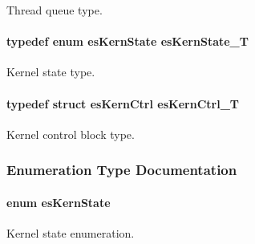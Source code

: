 Thread queue type. 

\hypertarget{group__kern__intf_gab5edef44fe53303f96dc5e9f567babaf}{
\paragraph[{es\-Kern\-State\-\_\-\-T}]{\setlength{\rightskip}{0pt plus 5cm}typedef enum {\bf es\-Kern\-State} {\bf es\-Kern\-State\-\_\-\-T}}}\label{group__kern__intf_gab5edef44fe53303f96dc5e9f567babaf}


Kernel state type. 

\hypertarget{group__kern__intf_gaae54a9918d92a2105b1d331b083d21b7}{
\paragraph[{es\-Kern\-Ctrl\-\_\-\-T}]{\setlength{\rightskip}{0pt plus 5cm}typedef struct {\bf es\-Kern\-Ctrl} {\bf es\-Kern\-Ctrl\-\_\-\-T}}}\label{group__kern__intf_gaae54a9918d92a2105b1d331b083d21b7}


Kernel control block type. 



\subsubsection{Enumeration Type Documentation}
\hypertarget{group__kern__intf_gac9be6bfeddbd6af148cdb3867fbc24af}{
\paragraph[{es\-Kern\-State}]{\setlength{\rightskip}{0pt plus 5cm}enum {\bf es\-Kern\-State}}}\label{group__kern__intf_gac9be6bfeddbd6af148cdb3867fbc24af}


Kernel state enumeration. 

